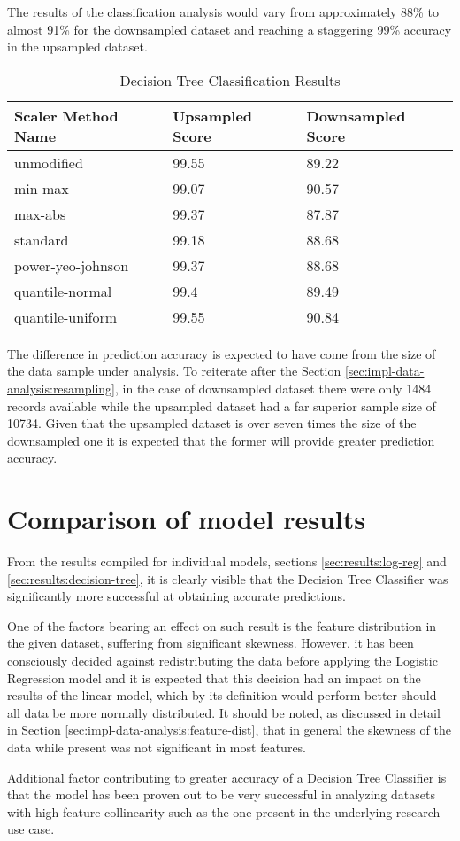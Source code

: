 The results of the classification analysis would vary from approximately 88\% to almost 91\% for the downsampled dataset and reaching a staggering 99\% accuracy in the upsampled dataset.
\begin{table}[h!]
\centering
\caption{Decision Tree Classification Results}
\label{tbl:results:decision-tree}
\begin{tabular}{@{}lll@{}}
\toprule
Scaler Method Name & Upsampled Score & Downsampled Score \\ \midrule
unmodified & 99.55& 89.22  \\
min-max & 99.07 & 90.57 \\
max-abs & 99.37 & 87.87 \\
standard & 99.18 & 88.68 \\
power-yeo-johnson & 99.37 & 88.68 \\
quantile-normal & 99.4 & 89.49 \\
quantile-uniform & 99.55 & 90.84 \\ \bottomrule
\end{tabular}
\end{table}

The difference in prediction accuracy is expected to have come from the size of the data sample under analysis. To reiterate after the Section \ref{sec:impl-data-analysis:resampling}, in the case of downsampled dataset there were only 1484 records available while the upsampled dataset had a far superior sample size of 10734. Given that the upsampled dataset is over seven times the size of the downsampled one it is expected that the former will provide greater prediction accuracy.

\section{Comparison of model results}
From the results compiled for individual models, sections \ref{sec:results:log-reg} and \ref{sec:results:decision-tree}, it is clearly visible that the Decision Tree Classifier was significantly more successful at obtaining accurate predictions. 

One of the factors bearing an effect on such result is the feature distribution in the given dataset, suffering from significant skewness. However, it has been consciously decided against redistributing the data before applying the Logistic Regression model and it is expected that this decision had an impact on the results of the linear model, which by its definition would perform better should all data be more normally distributed. It should be noted, as discussed in detail in Section \ref{sec:impl-data-analysis:feature-dist}, that in general the skewness of the data while present was not significant in most features.

Additional factor contributing to greater accuracy of a Decision Tree Classifier is that the model has been proven out to be very successful in analyzing datasets with high feature collinearity \cite{Bertsimas2017Cart} such as the one present in the underlying research use case. 
